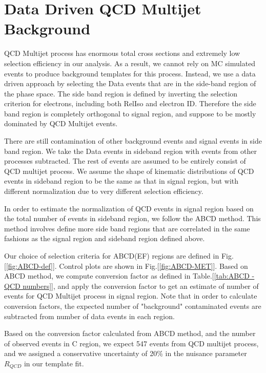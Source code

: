 \documentclass{cmspaperpdf}
\begin{document}
\clearpage

\appendix
\appendixpage
\addappheadtotoc

\section{Data Driven QCD Multijet Background}\label{sec:data driven qcd}

QCD Multijet process has enormous total cross sections and extremely low selection efficiency in our analysis. As a result, we cannot rely on MC simulated events to produce background templates for this process. Instead, we use a data driven approach by selecting the Data events that are in the side-band region of the phase space. The side band region is defined by inverting the selection criterion for electrons, including both RelIso and electron ID. Therefore the side band region is completely orthogonal to signal region, and suppose to be mostly dominated by QCD Multijet events. 

There are still contamination of other background events and signal events in side band region. We take the Data events in sideband region with events from other processes subtracted. The rest of events are assumed to be entirely consist of QCD multijet process. We assume the shape of kinematic distributions of QCD events in sideband region to be the same as that in signal region, but with different normalization due to very different selection efficiency. 

In order to estimate the normalization of QCD events in signal region based on the total number of events in sideband region, we follow the ABCD method. This method involves define more side band regions that are correlated in the same fashions as the signal region and sideband region defined above. 

Our choice of selection criteria for ABCD(EF) regions are defined in Fig.[\ref{fig:ABCD-def}].  Control plots are shown in Fig.[\ref{fig:ABCD-MET}]. Based on ABCD method, we compute conversion factor as defined in Table.[\ref{tab:ABCD - QCD numbers}], and apply the conversion factor to get an estimate of number of events for QCD Multijet process in signal region. Note that in order to calculate conversion factors, the expected number of "background" contaminated events are subtracted from number of data events in each region. 

Based on the conversion factor calculated from ABCD method, and the number of observed events in C region, we expect 547 events from QCD multijet process, and we assigned a conservative uncertainty of 20\% in the nuisance parameter $R_{QCD}$ in our template fit. 
\end{document}
